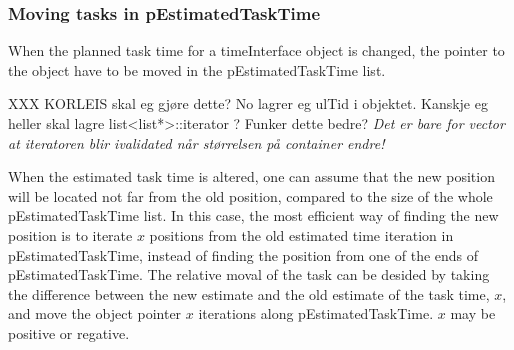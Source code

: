 


%

	\subsubsection{Moving tasks in pEstimatedTaskTime}
	When the planned task time for a timeInterface object is changed, the pointer to the object have to be moved in the pEstimatedTaskTime list.
	

	XXX KORLEIS skal eg gjøre dette? No lagrer eg ulTid i objektet. Kanskje eg heller skal lagre list<list*>::iterator ? Funker dette bedre?
	\emph{Det er bare for vector at iteratoren blir ivalidated når størrelsen på container endre!}

	When the estimated task time is altered, one can assume that the new position will be located not far from the old position, compared to the size of the whole pEstimatedTaskTime list.
	In this case, the most efficient way of finding the new position is to iterate $x$ positions from the old estimated time iteration in pEstimatedTaskTime, instead of finding the position from one of the ends of pEstimatedTaskTime.
	The relative moval of the task can be desided by taking the difference between the new estimate and the old estimate of the task time, $x$, and move the object pointer $x$ iterations along pEstimatedTaskTime. 
	$x$ may be positive or regative.
	
